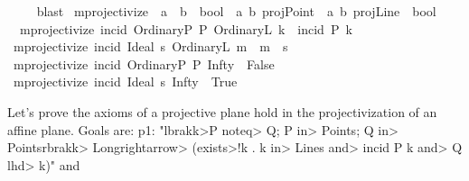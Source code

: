 \begin{isabellebody}
\ {}\ {}\ \isamarkupfalse%
\ blast\isanewline
{}\isamarkupfalse%
%
\endisatagproof
{\isafoldproof}%
%
\isadelimproof
\isanewline
%
\endisadelimproof
\isanewline
\isanewline
{}\isamarkupfalse%
\ mprojectivize\ {\isacharcolon}{\kern0pt}{\isacharcolon}{\kern0pt}\ {\isachardoublequoteopen}{\isacharparenleft}{\kern0pt}{\isacharprime}{\kern0pt}a\ {\isasymRightarrow}\ {\isacharprime}{\kern0pt}b\ {\isasymRightarrow}\ bool{\isacharparenright}{\kern0pt}\ {\isasymRightarrow}\ {\isacharparenleft}{\kern0pt}{\isacharparenleft}{\kern0pt}{\isacharprime}{\kern0pt}a{\isacharcomma}{\kern0pt}\ {\isacharprime}{\kern0pt}b{\isacharparenright}{\kern0pt}\ projPoint\ {\isasymRightarrow}\ {\isacharparenleft}{\kern0pt}{\isacharprime}{\kern0pt}a{\isacharcomma}{\kern0pt}\ {\isacharprime}{\kern0pt}b{\isacharparenright}{\kern0pt}\ projLine\ {\isasymRightarrow}\ bool{\isacharparenright}{\kern0pt}{\isachardoublequoteclose}\ \isanewline
\ \ {\isachardoublequoteopen}mprojectivize\ {\isacharparenleft}{\kern0pt}incid{\isacharparenright}{\kern0pt}\ {\isacharparenleft}{\kern0pt}OrdinaryP\ P{\isacharparenright}{\kern0pt}\ {\isacharparenleft}{\kern0pt}OrdinaryL\ k{\isacharparenright}{\kern0pt}\ {\isacharequal}{\kern0pt}\ incid\ P\ k{\isachardoublequoteclose}\isanewline
{\isacharbar}{\kern0pt}\ {\isachardoublequoteopen}mprojectivize\ {\isacharparenleft}{\kern0pt}incid{\isacharparenright}{\kern0pt}\ {\isacharparenleft}{\kern0pt}Ideal\ s{\isacharparenright}{\kern0pt}\ {\isacharparenleft}{\kern0pt}OrdinaryL\ m{\isacharparenright}{\kern0pt}\ {\isacharequal}{\kern0pt}\ {\isacharparenleft}{\kern0pt}m\ {\isasymin}\ s{\isacharparenright}{\kern0pt}{\isachardoublequoteclose}\isanewline
{\isacharbar}{\kern0pt}\ {\isachardoublequoteopen}mprojectivize\ {\isacharparenleft}{\kern0pt}incid{\isacharparenright}{\kern0pt}\ {\isacharparenleft}{\kern0pt}OrdinaryP\ P{\isacharparenright}{\kern0pt}\ Infty\ {\isacharequal}{\kern0pt}\ False{\isachardoublequoteclose}\isanewline
{\isacharbar}{\kern0pt}\ {\isachardoublequoteopen}mprojectivize\ {\isacharparenleft}{\kern0pt}incid{\isacharparenright}{\kern0pt}\ {\isacharparenleft}{\kern0pt}Ideal\ s{\isacharparenright}{\kern0pt}\ Infty\ {\isacharequal}{\kern0pt}\ True{\isachardoublequoteclose}%
\begin{isamarkuptext}%
Let's prove the axioms of a projective plane hold in the projectivization of an 
affine plane. Goals are: 
    p1: "\<lbrakk>P \<noteq> Q; P \<in> Points; Q \<in> Points\<rbrakk> \<Longrightarrow> (\<exists>!k . k \<in> Lines \<and> incid P k  \<and> Q \<lhd>  k)" and

\end{isamarkuptext}
\end{isabellebody}
